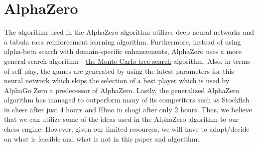 \documentclass[notitlepage, 12pt]{article}
\begin{document}
\section*{AlphaZero}
The algorithm used in the AlphaZero algorithm utilizes deep neural networks and a tabula rasa reinforcement learning algorithm. Furthermore, instead of using alpha-beta search with domain-specific enhancements, AlphaZero uses a more general search algorithm—\href{https://en.wikipedia.org/wiki/Monte_Carlo_tree_search}{the Monte Carlo tree search} algorithm. Also, in terms of self-play, the games are generated by using the latest parameters for this neural network which skips the selection of a best player which is used by AlphaGo Zero a predecessor of AlphaZero. Lastly, the generalized AlphaZero algorithm has managed to outperform many of its competitors such as Stockfish in chess after just 4 hours and Elmo in shogi after only 2 hours. Thus, we believe that we can utilize some of the ideas used in the AlphaZero algorithm to our chess engine. However, given our limited resources, we will have to adapt/decide on what is feasible and what is not in this paper and algorithm.


\end{document}
